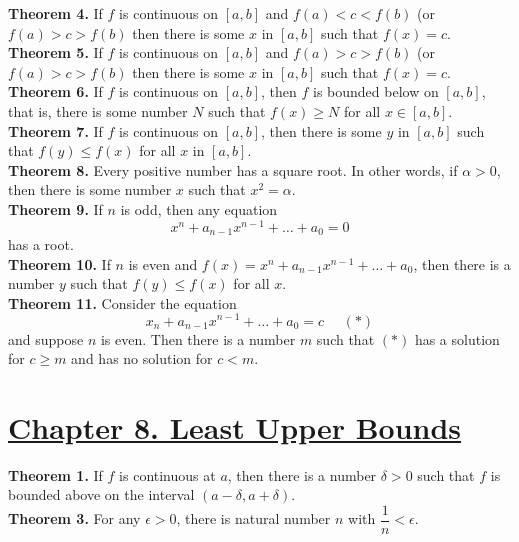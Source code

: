 \documentclass[10pt,letterpaper]{article}
\begin{document}
	
	\textbf{Theorem 4.} If $f$ is continuous on $[a, b]$ and $f(a) < c < f(b)$ (or $f(a) > c > f(b)$ then there is some $x$ in $[a, b]$
	such that $f(x) = c$.\\
	
	\textbf{Theorem 5.} If $f$ is continuous on $[a, b]$ and $f(a) > c > f(b)$ (or $f(a) > c > f(b)$ then there is some $x$ in $[a, b]$
	such that $f(x) = c$.\\
	
	\textbf{Theorem 6.} If $f$ is continuous on $[a, b]$, then $f$ is bounded below on $[a, b]$, that is, there
	is some number $N$ such that $f(x) \geq N$ for all $x \in [a, b]$. \\
	
		
	\textbf{Theorem 7.} If $f$ is continuous on $[a, b]$, then there is some $y$ in $[a, b]$ such that
	$f(y) \leq f(x)$ for all $x$ in $[a, b]$.  \\
	
	\textbf{Theorem 8.} Every positive number has a square root. In other words, if $\alpha > 0$,
	then there is some number $x$ such that $x^2 = \alpha$. \\
	
	\textbf{Theorem 9.} If $n$ is odd, then any equation
	$$x^n + a_{n-1}x^{n-1} + \ldots + a_0 = 0$$ 
	has a root. \\
	
	\textbf{Theorem 10. } If $n$ is even and $f(x) = x^n + a_{n-1}x^{n-1} + \ldots + a_0$,
	then there is a number $y$ such that $f(y) \leq f(x)$ for all $x$. \\
	
	\textbf{Theorem 11. } Consider the equation
	$$x_n + a_{n-1}x^{n-1} + \ldots + a_0 = c \, \, \, \, \, \, \,  \, (*)$$
	and suppose $n$ is even. Then there is a number $m$ such that $(*)$ has a solution
	for $c \geq m$ and has no solution for $c < m$.		
		 
	\section*{{\color{red}\underline{Chapter 8. Least Upper Bounds}}}
	\textbf{Theorem 1. }	
	If $f$ is continuous at $a$, then there is a number $\delta > 0$ such that
	$f$ is bounded above on the interval $(a - \delta, a + \delta)$. \\
	
	\textbf{Theorem 3. } For any $\epsilon > 0$, there is natural number
	$n$ with $\dfrac{1}{n} < \epsilon$.
		
		
\end{document}
